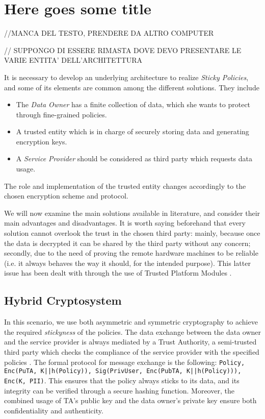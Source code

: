 \chapter{Here goes some title}
\label{capitolo2}
\thispagestyle{empty}

//MANCA DEL TESTO, PRENDERE DA ALTRO COMPUTER

// SUPPONGO DI ESSERE RIMASTA DOVE DEVO PRESENTARE LE VARIE ENTITA' DELL'ARCHITETTURA

It is necessary to develop an underlying architecture to realize \textit{Sticky Policies}, and some of its elements are common among the different solutions. They include
 \begin{itemize}
 	\item The \textit{Data Owner} has a finite collection of data, which she wants to protect through fine-grained policies.
 	\item A trusted entity which is in charge of securely storing data and generating encryption keys.
 	\item A \textit{Service Provider} should be considered as third party which requests data usage.
 \end{itemize}
The role and implementation of the trusted entity changes accordingly to the chosen encryption scheme and protocol.

We will now examine the main solutions available in literature, and consider their main advantages and disadvantages. It is worth saying beforehand that every solution cannot overlook the trust in the chosen third party: mainly, because once the data is decrypted it can be shared by the third party without any concern; secondly, due to the need of proving the remote hardware machines to be reliable (i.e. it always behaves the way it should, for the intended purpose). This latter issue has been dealt with through the use of Trusted Platform Modules \cite{standard2009trusted}.

\section{Hybrid Cryptosystem}
In this scenario, we use both asymmetric and symmetric cryptography to achieve the required \textit{stickyness} of the policies. The data exchange between the data owner and the service provider is always mediated by a Trust Authority, a semi-trusted third party which checks the compliance of the service provider with the specified policies \cite{pearson2011sticky}. The formal protocol for message exchange is the following: \texttt{Policy, Enc(PuTA, K||h(Policy)), Sig(PrivUser, Enc(PubTA, K||h(Policy))), Enc(K, PII)}. This ensures that the policy always sticks to its data, and its integrity can be verified through a secure hashing function. Moreover, the combined usage of TA's public key and the data owner's private key ensure both confidentiality and authenticity.

